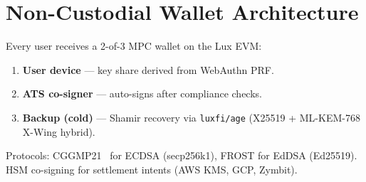 \section{Non-Custodial Wallet Architecture}


Every user receives a 2-of-3 MPC wallet on the Lux EVM:

\begin{enumerate}[nosep]
  \item \textbf{User device} --- key share derived from WebAuthn PRF.
  \item \textbf{ATS co-signer} --- auto-signs after compliance checks.
  \item \textbf{Backup (cold)} --- Shamir recovery via
        \texttt{luxfi/age} (X25519 + ML-KEM-768 X-Wing hybrid).
\end{enumerate}

Protocols: CGGMP21~\cite{cggmp21} for ECDSA (secp256k1), FROST for
EdDSA (Ed25519). HSM co-signing for settlement intents
(AWS KMS, GCP, Zymbit).

